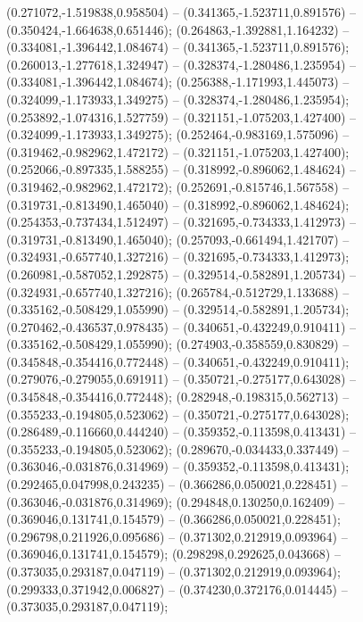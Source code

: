  (0.271072,-1.519838,0.958504) -- (0.341365,-1.523711,0.891576) -- (0.350424,-1.664638,0.651446);
 (0.264863,-1.392881,1.164232) -- (0.334081,-1.396442,1.084674) -- (0.341365,-1.523711,0.891576);
 (0.260013,-1.277618,1.324947) -- (0.328374,-1.280486,1.235954) -- (0.334081,-1.396442,1.084674);
 (0.256388,-1.171993,1.445073) -- (0.324099,-1.173933,1.349275) -- (0.328374,-1.280486,1.235954);
 (0.253892,-1.074316,1.527759) -- (0.321151,-1.075203,1.427400) -- (0.324099,-1.173933,1.349275);
 (0.252464,-0.983169,1.575096) -- (0.319462,-0.982962,1.472172) -- (0.321151,-1.075203,1.427400);
 (0.252066,-0.897335,1.588255) -- (0.318992,-0.896062,1.484624) -- (0.319462,-0.982962,1.472172);
 (0.252691,-0.815746,1.567558) -- (0.319731,-0.813490,1.465040) -- (0.318992,-0.896062,1.484624);
 (0.254353,-0.737434,1.512497) -- (0.321695,-0.734333,1.412973) -- (0.319731,-0.813490,1.465040);
 (0.257093,-0.661494,1.421707) -- (0.324931,-0.657740,1.327216) -- (0.321695,-0.734333,1.412973);
 (0.260981,-0.587052,1.292875) -- (0.329514,-0.582891,1.205734) -- (0.324931,-0.657740,1.327216);
 (0.265784,-0.512729,1.133688) -- (0.335162,-0.508429,1.055990) -- (0.329514,-0.582891,1.205734);
 (0.270462,-0.436537,0.978435) -- (0.340651,-0.432249,0.910411) -- (0.335162,-0.508429,1.055990);
 (0.274903,-0.358559,0.830829) -- (0.345848,-0.354416,0.772448) -- (0.340651,-0.432249,0.910411);
 (0.279076,-0.279055,0.691911) -- (0.350721,-0.275177,0.643028) -- (0.345848,-0.354416,0.772448);
 (0.282948,-0.198315,0.562713) -- (0.355233,-0.194805,0.523062) -- (0.350721,-0.275177,0.643028);
 (0.286489,-0.116660,0.444240) -- (0.359352,-0.113598,0.413431) -- (0.355233,-0.194805,0.523062);
 (0.289670,-0.034433,0.337449) -- (0.363046,-0.031876,0.314969) -- (0.359352,-0.113598,0.413431);
 (0.292465,0.047998,0.243235) -- (0.366286,0.050021,0.228451) -- (0.363046,-0.031876,0.314969);
 (0.294848,0.130250,0.162409) -- (0.369046,0.131741,0.154579) -- (0.366286,0.050021,0.228451);
 (0.296798,0.211926,0.095686) -- (0.371302,0.212919,0.093964) -- (0.369046,0.131741,0.154579);
 (0.298298,0.292625,0.043668) -- (0.373035,0.293187,0.047119) -- (0.371302,0.212919,0.093964);
 (0.299333,0.371942,0.006827) -- (0.374230,0.372176,0.014445) -- (0.373035,0.293187,0.047119);
